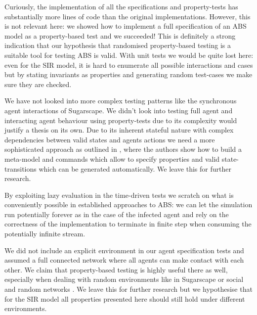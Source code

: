 
Curiously, the implementation of all the specifications and property-tests has substantially more lines of code than the original implementations. However, this is not relevant here: we showed how to implement a full specification of an ABS model as a property-based test and we succeeded! This is definitely a strong indication that our hypothesis that randomised property-based testing is a suitable tool for testing ABS is valid. With unit tests we would be quite lost here: even for the SIR model, it is hard to enumerate all possible interactions and cases but by stating invariants as properties and generating random test-cases we make sure they are checked.

We have not looked into more complex testing patterns like the synchronous agent interactions of Sugarscape. We didn't look into testing full agent and interacting agent behaviour using property-tests due to its complexity would justify a thesis on its own. Due to its inherent stateful nature with complex dependencies between valid states and agents actions we need a more sophisticated approach as outlined in \cite{de_vries_-depth_2019}, where the authors show how to build a meta-model and commands which allow to specify properties and valid state-transitions which can be generated automatically. We leave this for further research.

By exploiting lazy evaluation in the time-driven tests we scratch on what is conveniently possible in established approaches to ABS: we can let the simulation run potentially forever as in the case of the infected agent and rely on the correctness of the implementation to terminate in finite step when consuming the potentially infinite stream.

We did not include an explicit environment in our agent specification tests and assumed a full connected network where all agents can make contact with each other. We claim that property-based testing is highly useful there as well, especially when dealing with random environments like in Sugarscape or social and random networks \cite{easley_networks_2010,jackson_social_2008}. We leave this for further research but we hypothesise that for the SIR model all properties presented here should still hold under different environments.
